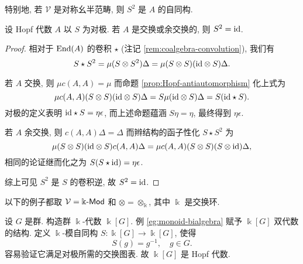 特别地, 若 $\mathcal{V}$ 是对称幺半范畴, 则 $S^2$ 是 $A$ 的自同构.

\begin{corollary}\label{prop:Hopf-involution}
	设 Hopf 代数 $A$ 以 $S$ 为对极. 若 $A$ 是交换或余交换的, 则 $S^2 = \mathrm{id}$.
\end{corollary}
\begin{proof}
	相对于 $\operatorname{End}(A)$ 的卷积 $\star$ (注记 \ref{rem:coalgebra-convolution}), 我们有
	\[ S \star S^2 = \mu (S \otimes S^2) \Delta = \mu (S \otimes S)(\mathrm{id} \otimes S) \Delta. \]
	
	若 $A$ 交换, 则 $\mu c(A, A) = \mu$ 而命题 \ref{prop:Hopf-antiautomorphism} 化上式为
	\[ \mu c(A, A) (S \otimes S) (\mathrm{id} \otimes S)\Delta = S\mu (\mathrm{id} \otimes S)\Delta = S(\mathrm{id} \star S). \]
	对极的定义表明 $\mathrm{id} \star S = \eta\epsilon$, 而上述命题蕴涵 $S\eta = \eta$, 最终得到 $\eta\epsilon$.
	
	若 $A$ 余交换, 则 $c(A, A) \Delta = \Delta$ 而辫结构的函子性化 $S \star S^2$ 为
	\[ \mu (S \otimes S)(\mathrm{id} \otimes S) c(A, A) \Delta = \mu c(A, A) (S \otimes S)(S \otimes \mathrm{id})\Delta, \]
	相同的论证继而化之为 $S(S \star \mathrm{id}) = \eta\epsilon$.
	
	综上可见 $S^2$ 是 $S$ 的卷积逆, 故 $S^2 = \mathrm{id}$.
\end{proof}

以下的例子都取 $\mathcal{V} = \Bbbk\text{-}\mathsf{Mod}$ 和 $\otimes = \otimes_{\Bbbk}$, 其中 $\Bbbk$ 是交换环.

\begin{example}\label{eg:group-Hopf-algebra}
	设 $G$ 是群. 构造群 $\Bbbk$-代数 $\Bbbk[G]$. 例 \ref{eg:monoid-bialgebra} 赋予 $\Bbbk[G]$ 双代数的结构. 定义 $\Bbbk$-模自同构 $S: \Bbbk[G] \to \Bbbk[G]$, 使得
	\[ S(g) = g^{-1}, \quad g \in G. \]
	容易验证它满足对极所需的交换图表. 故 $\Bbbk[G]$ 是 Hopf 代数.
\end{example}

